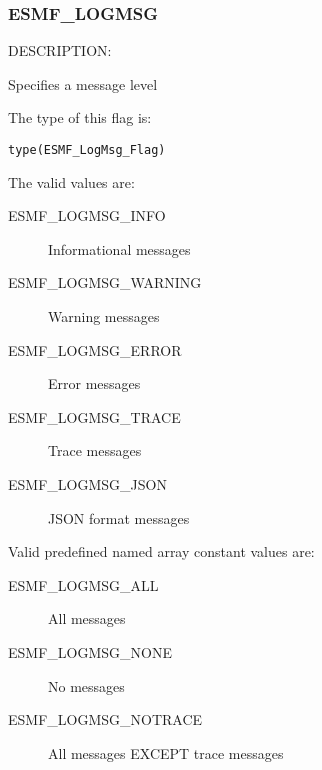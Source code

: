 \subsubsection{ESMF\_LOGMSG}
\label{const:logmsgflag}

{\sf DESCRIPTION:\\}
\begin{sloppypar}
Specifies a message level
\end{sloppypar}

The type of this flag is:

{\tt type(ESMF\_LogMsg\_Flag)}

The valid values are:
\begin{description}
   \item [ESMF\_LOGMSG\_INFO] 
         Informational messages
   \item [ESMF\_LOGMSG\_WARNING]
         Warning messages
   \item [ESMF\_LOGMSG\_ERROR]
         Error messages
   \item [ESMF\_LOGMSG\_TRACE]
         Trace messages
   \item [ESMF\_LOGMSG\_JSON]
         JSON format messages
\end{description}

Valid predefined named array constant values are:

\begin{description}
	\item [ESMF\_LOGMSG\_ALL]
		All messages
	\item [ESMF\_LOGMSG\_NONE]
		No messages
	\item [ESMF\_LOGMSG\_NOTRACE]
		All messages EXCEPT trace messages
\end{description}


